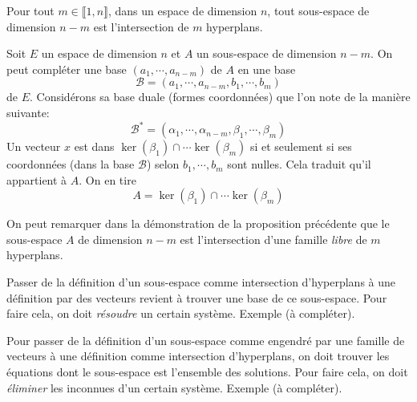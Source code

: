 \begin{propn} \label{interhyp}
 Pour tout $m\in \llbracket 1 ,n\rrbracket$, dans un espace de dimension $n$, tout sous-espace de dimension $n-m$ est l'intersection de $m$ hyperplans.
\end{propn}
\begin{demo}
Soit $E$ un espace de dimension $n$ et $A$ un sous-espace de dimension $n-m$. On peut compléter une base $(a_1,\cdots,a_{n-m})$ de $A$ en une base 
\begin{displaymath}
\mathcal{B} = (a_1,\cdots,a_{n-m},b_1,\cdots,b_m)  
\end{displaymath}
de $E$. Considérons sa base duale (formes coordonnées) que l'on note de la manière suivante:
\begin{displaymath}
\mathcal{B}^* =   (\alpha_1,\cdots,\alpha_{n-m},\beta_1,\cdots,\beta_m)
\end{displaymath}
Un vecteur $x$ est dans $\ker(\beta_1)\cap \cdots \ker(\beta_m)$ si et seulement si ses coordonnées (dans la base $\mathcal{B}$) selon $b_1,\cdots, b_m$ sont nulles. Cela traduit qu'il appartient à $A$. On en tire
\begin{displaymath}
  A = \ker(\beta_1)\cap \cdots \ker(\beta_m)
\end{displaymath}
\end{demo}
\begin{rem}
  On peut remarquer dans la démonstration de la proposition précédente que le sous-espace $A$ de dimension $n-m$ est l'intersection d'une famille \emph{libre} de $m$ hyperplans.
\end{rem}

Passer de la définition d'un sous-espace comme intersection d'hyperplans à une définition par des vecteurs revient à trouver une base de ce sous-espace. Pour faire cela, on doit \emph{résoudre} un certain système.\newline
Exemple (à compléter).

Pour passer de la définition d'un sous-espace comme engendré par une famille de vecteurs à une définition comme intersection d'hyperplans, on doit trouver les équations dont le sous-espace est l'ensemble des solutions. Pour faire cela, on doit \emph{éliminer} les inconnues d'un certain système.\newline
Exemple (à compléter).

